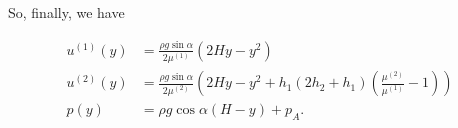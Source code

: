 So, finally, we have

\begin{align}\label{eqn:twoLayerInclinedFlow:575}
u^{(1)}(y) &= \frac{\rho g \sin\alpha }{2 \mu^{(1)}} (2 H y -y^2) \\
u^{(2)}(y) &= \frac{\rho g \sin\alpha }{2 \mu^{(2)}} \left( 2 H y -y^2 + h_1 (2 h_2 + h_1) 
\left( \frac{\mu^{(2)}}{\mu^{(1)}} - 1 \right)
\right) \\
p(y) &= \rho g \cos\alpha (H - y) + p_A.
\end{align}

\EndArticle

